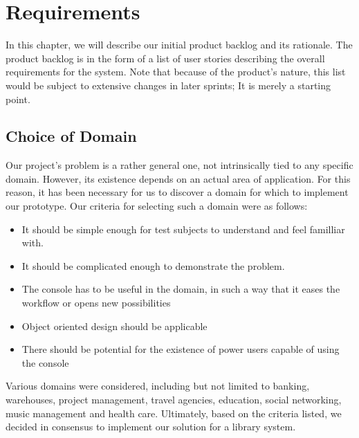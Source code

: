 \chapter{Requirements}

\minitoc

In this chapter, we will describe our initial product backlog and its rationale. The product backlog is in the form of a list of user stories describing the overall requirements for the system. Note that because of the product's nature, this list would be subject to extensive changes in later sprints; It is merely a starting point.

\clearpage

\section{Choice of Domain}
Our project's problem is a rather general one, not intrinsically tied to any specific domain. However, its existence depends on an actual area of application. For this reason, it has been necessary for us to discover a domain for which to implement our prototype. Our criteria for selecting such a domain were as follows:
\begin{itemize}
\item It should be simple enough for test subjects to understand and feel familliar with.
\item It should be complicated enough to demonstrate the problem.
\item The console has to be useful in the domain, in such a way that it eases the workflow or opens new possibilities
\item Object oriented design should be applicable
\item There should be potential for the existence of power users capable of using the console
\end{itemize}
Various domains were considered, including but not limited to banking, warehouses, project management, travel agencies, education, social networking, music management and health care. Ultimately, based on the criteria listed, we decided in consensus to implement our solution for a library system.

